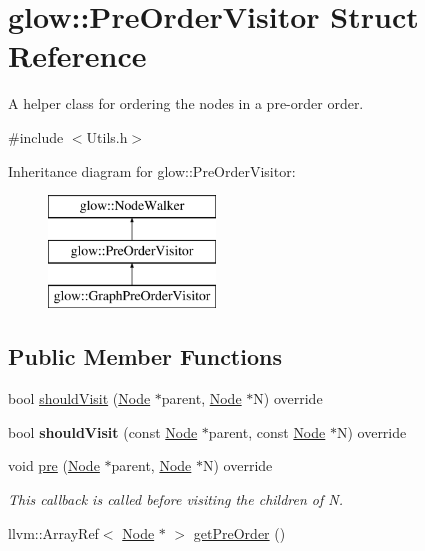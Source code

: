 \hypertarget{structglow_1_1_pre_order_visitor}{}\section{glow\+:\+:Pre\+Order\+Visitor Struct Reference}
\label{structglow_1_1_pre_order_visitor}


A helper class for ordering the nodes in a pre-\/order order.  




{\ttfamily \#include $<$Utils.\+h$>$}

Inheritance diagram for glow\+:\+:Pre\+Order\+Visitor\+:\begin{figure}[H]
\begin{center}
\leavevmode
\includegraphics[height=3.000000cm]{structglow_1_1_pre_order_visitor}
\end{center}
\end{figure}
\subsection*{Public Member Functions}
\begin{DoxyCompactItemize}
\item 
bool \hyperlink{structglow_1_1_pre_order_visitor_ac8c137afc60efc698bfcaca489b073db}{should\+Visit} (\hyperlink{classglow_1_1_node}{Node} $\ast$parent, \hyperlink{classglow_1_1_node}{Node} $\ast$N) override
\item 
\mbox{\label{structglow_1_1_pre_order_visitor_a7815820d39e31f93c3ccec281dd1398d}} 
bool {\bfseries should\+Visit} (const \hyperlink{classglow_1_1_node}{Node} $\ast$parent, const \hyperlink{classglow_1_1_node}{Node} $\ast$N) override
\item 
\mbox{\label{structglow_1_1_pre_order_visitor_a389f7a32b51a4238287508443287aec9}} 
void \hyperlink{structglow_1_1_pre_order_visitor_a389f7a32b51a4238287508443287aec9}{pre} (\hyperlink{classglow_1_1_node}{Node} $\ast$parent, \hyperlink{classglow_1_1_node}{Node} $\ast$N) override
\begin{DoxyCompactList}\small\item\em This callback is called before visiting the children of {\ttfamily N}. \end{DoxyCompactList}\item 
llvm\+::\+Array\+Ref$<$ \hyperlink{classglow_1_1_node}{Node} $\ast$ $>$ \hyperlink{structglow_1_1_pre_order_visitor_a255e69ad29413aa03ee4c068316100ad}{get\+Pre\+Order} ()
\end{DoxyCompactItemize}
